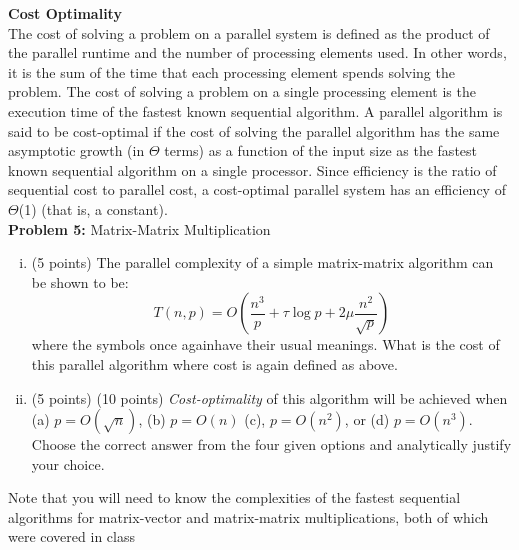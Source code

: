 \documentclass{article}
\begin{document}
    \textbf{Cost Optimality} \\
    The cost of solving a problem on a parallel system is defined as the product of the parallel runtime and
    the number of processing elements used. In other words, it is the sum of the time that each processing
    element spends solving the problem. The cost of solving a problem on a single processing element is the
    execution time of the fastest known sequential algorithm. A parallel algorithm is said to be cost-optimal
    if the cost of solving the parallel algorithm has the same asymptotic growth (in $\Theta$ terms) as a function of
    the input size as the fastest known sequential algorithm on a single processor. Since efficiency is the ratio
    of sequential cost to parallel cost, a cost-optimal parallel system has an efficiency of $\Theta$(1) (that is, a constant). \\


    \textbf{Problem 5:} Matrix-Matrix Multiplication
    \begin{enumerate}[i.]
    \item (5 points) The parallel complexity of a simple matrix-matrix algorithm can be shown to be:
    \begin{equation}
        T(n,p) = O(\frac{n^3}{p} + \tau\log{p}+2\mu\frac{n^2}{\sqrt{p}})
    \end{equation}
    where the symbols once againhave their usual meanings. What is the cost of this parallel algorithm
where cost is again defined as above.

    \item (5 points) (10 points) \textit{Cost-optimality} of this algorithm will be achieved when (a) $p = O(\sqrt{n})$, (b) $p = O(n)$ (c),
    $p = O(n^2)$, or (d) $p = O(n^3)$. Choose the correct answer from the four given options and analytically
    justify your choice.
    \end{enumerate}

Note that you will need to know the complexities of the fastest sequential algorithms for matrix-vector and
matrix-matrix multiplications, both of which were covered in class

    
\end{document}
